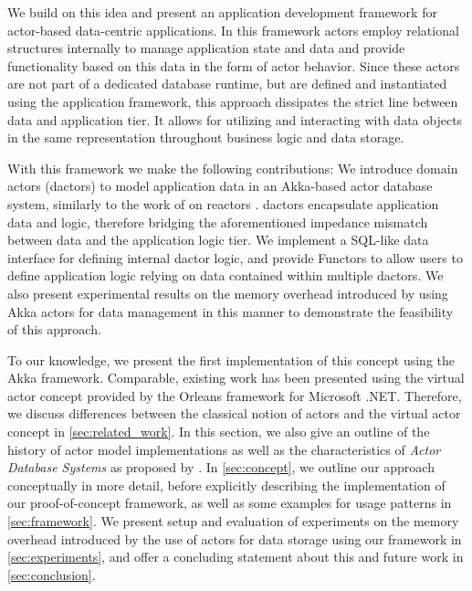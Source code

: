  We build on this idea and present an application development framework for actor-based data-centric applications.
  In this framework actors employ relational structures internally to manage application state and data
  and provide functionality based on this data in the form of actor behavior.
  Since these actors are not part of a dedicated database runtime, but are defined and instantiated using the application framework, this approach dissipates the strict line between data and application tier.
  It allows for utilizing and interacting with data objects in the same representation throughout business logic and data storage.

  With this framework we make the following contributions:
  We introduce domain actors (\glspl{dactor}) to model application data in an Akka-based actor database system, similarly to the work of \citeauthor{Shah:reactdb} on reactors \cite{Shah:reactdb}.
  \Glspl{dactor} encapsulate application data and logic, therefore bridging the aforementioned impedance mismatch between data and the application logic tier.
  We implement a SQL-like data interface for defining internal \gls{dactor} logic, and provide Functors to allow users to define application logic relying on data contained within multiple \glspl{dactor}.
  We also present experimental results on the memory overhead introduced by using Akka actors for data management in this manner to demonstrate the feasibility of this approach.

  To our knowledge, we present the first implementation of this concept using the Akka framework.
  Comparable, existing work has been presented using the virtual actor concept provided by the Orleans framework for Microsoft .NET.
  Therefore, we discuss differences between the classical notion of actors and the virtual actor concept in \cref{sec:related_work}.
  In this section, we also give an outline of the history of actor model implementations as well as the characteristics of \textit{Actor Database Systems} as proposed by \citeauthor{manifesto}.
  In \cref{sec:concept}, we outline our approach conceptually in more detail,
  before explicitly describing the implementation of our proof-of-concept framework, as well as some examples for usage patterns in \cref{sec:framework}.
  We present setup and evaluation of experiments on the memory overhead introduced by the use of actors for data storage using our framework in \cref{sec:experiments},
  and offer a concluding statement about this and future work in \cref{sec:conclusion}.
  

